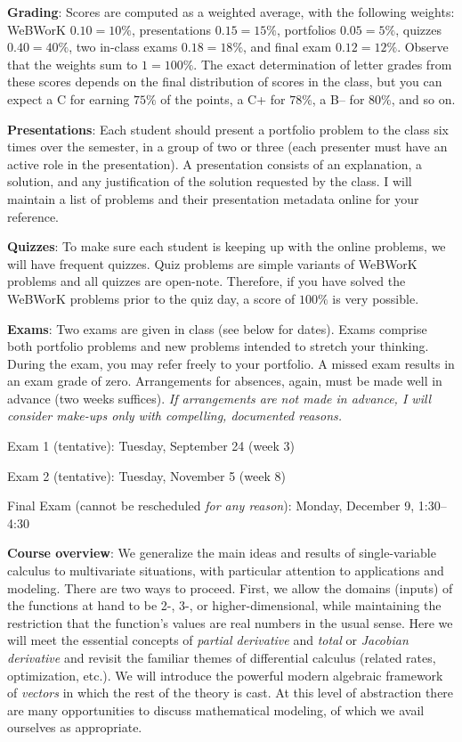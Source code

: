 \documentclass[12pt,twoside]{amsart}
\begin{document}
\textbf{Grading}: Scores are computed as a weighted average, with the following weights: WeBWorK $0.10 = 10\%$, presentations $0.15 = 15\%$, portfolios $0.05 = 5\%$, quizzes $0.40 = 40\%$, two in-class exams $0.18 = 18\%$, and final exam $0.12 = 12\%$. Observe that the weights sum to $1 = 100\%$. The exact determination of letter grades from these scores depends on the final distribution of scores in the class, but you can expect a C for earning $75\%$ of the points, a C+ for $78\%$, a B-- for $80\%$, and so on.

\textbf{Presentations}: Each student should present a portfolio problem to the class six times over the semester, in a group of two or three (each presenter must have an active role in the presentation). A presentation consists of an explanation, a solution, and any justification of the solution requested by the class. I will maintain a list of problems and their presentation metadata online for your reference.

\textbf{Quizzes}: To make sure each student is keeping up with the online problems, we will have frequent quizzes. Quiz problems are simple variants of WeBWorK problems and all quizzes are open-note. Therefore, if you have solved the WeBWorK problems prior to the quiz day, a score of $100\%$ is very possible.

\textbf{Exams}: Two exams are given in class (see below for dates). Exams comprise both portfolio problems and new problems intended to stretch your thinking. During the exam, you may refer freely to your portfolio. A missed exam results in an exam grade of zero. Arrangements for absences, again, must be made well in advance (two weeks suffices). \emph{If arrangements are not made in advance, I will consider make-ups only with compelling, documented reasons.} 
\begin{compactitem}
	\item Exam 1 (tentative): Tuesday, September 24 (week 3)
    \item Exam 2 (tentative): Tuesday, November 5 (week 8)
	\item Final Exam (cannot be rescheduled \emph{for any reason}): Monday, December 9, 1:30--4:30
\end{compactitem}

\textbf{Course overview}: We generalize the main ideas and results of single-variable calculus to multivariate situations, with particular attention to applications and modeling. There are two ways to proceed. First, we allow the domains (inputs) of the functions at hand to be 2-, 3-, or higher-dimensional, while maintaining the restriction that the function's values are real numbers in the usual sense. Here we will meet the essential concepts of \emph{partial derivative} and \emph{total} or \emph{Jacobian derivative} and revisit the familiar themes of differential calculus (related rates, optimization, etc.). We will introduce the powerful modern algebraic framework of \emph{vectors} in which the rest of the theory is cast. At this level of abstraction there are many opportunities to discuss mathematical modeling, of which we avail ourselves as appropriate.
\end{document}
